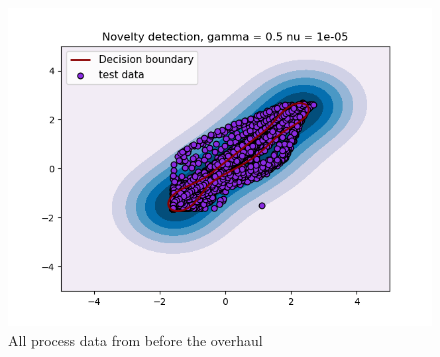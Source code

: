     
    \begin{figure}
        \centering
        \includegraphics[scale=0.8]{report/figures/analysis/hjartdola/hjar_n2_4_novelty_05_1e-5_test.png}
        \caption{All process data from before the overhaul}
        \label{fig:my_label}
    \end{figure}




